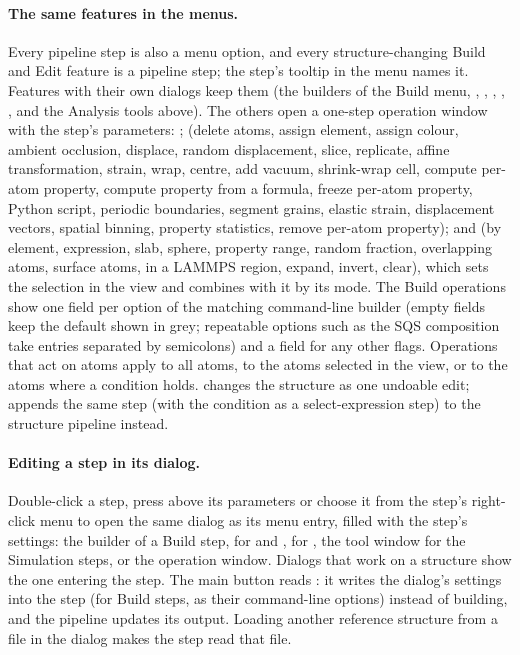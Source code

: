 \paragraph{The same features in the menus.} Every pipeline step is also a menu option, and every structure-changing Build and Edit feature is a pipeline step; the step's tooltip in the menu names it. Features with their own dialogs keep them (the builders of the Build menu, , , , , ,  and the Analysis tools above). The others open a one-step operation window with the step's parameters: ;  (delete atoms, assign element, assign colour, ambient occlusion, displace, random displacement, slice, replicate, affine transformation, strain, wrap, centre, add vacuum, shrink-wrap cell, compute per-atom property, compute property from a formula, freeze per-atom property, Python script, periodic boundaries, segment grains, elastic strain, displacement vectors, spatial binning, property statistics, remove per-atom property); and  (by element, expression, slab, sphere, property range, random fraction, overlapping atoms, surface atoms, in a LAMMPS region, expand, invert, clear), which sets the selection in the view and combines with it by its mode. The Build operations show one field per option of the matching command-line builder (empty fields keep the default shown in grey; repeatable options such as the SQS composition take entries separated by semicolons) and a field for any other flags. Operations that act on atoms apply to all atoms, to the atoms selected in the view, or to the atoms where a condition holds.  changes the structure as one undoable edit;  appends the same step (with the condition as a select-expression step) to the structure pipeline instead.

\paragraph{Editing a step in its dialog.} Double-click a step, press  above its parameters or choose it from the step's right-click menu to open the same dialog as its menu entry, filled with the step's settings: the builder of a Build step,  for  and ,  for , the tool window for the Simulation steps, or the operation window. Dialogs that work on a structure show the one entering the step. The main button reads : it writes the dialog's settings into the step (for Build steps, as their command-line options) instead of building, and the pipeline updates its output. Loading another reference structure from a file in the dialog makes the step read that file.

